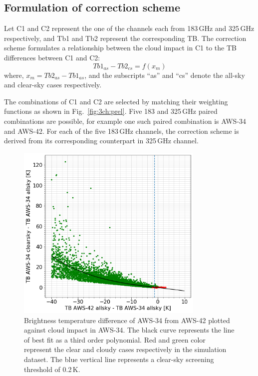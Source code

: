 \documentclass[12pt]{article}
\begin{document}
\subsection{Formulation of correction scheme}
%
Let C1 and C2 represent the one of the channels each from 183\,GHz and 325\,GHz
respectively, and Tb1 and Tb2 represent the corresponding TB. The correction
scheme formulates a relationship between the cloud impact in C1 to the TB
differences between C1 and C2:
\begin{equation}
Tb1_{as}-Tb2_{cs} = f(x_m)
\label{eq:TB:diff}
\end{equation}
where, $x_m = Tb2_{as} - Tb1_{as}$, and the subscripts ``as'' and ``cs'' denote the all-sky and clear-sky cases respectively.  

The combinations of C1 and C2 are selected by matching their weighting
functions as shown in Fig.~\ref{fig:3ch:prel}. Five 183 and 325\,GHz paired
combinations are possible, for example one such paired combination is AWS-34
and AWS-42. For each of the five 183\,GHz channels, the correction scheme is
derived from its corresponding counterpart in 325\,GHz channel.

\begin{figure}[!tb]
	\centering
	\includegraphics[height=85mm]{fit_AWS-34_AWS-42}\hspace{5mm}%
	\caption{Brightness temperature difference of AWS-34 from AWS-42 plotted
      against cloud impact in AWS-34. The black curve represents the line of
      best fit as a third order polynomial. Red and green color represent the
      clear and cloudy cases respectively in the simulation dataset. The blue
      vertical line represents a clear-sky screening threshold of 0.2\,K. }
	\label{fig:fit:c34-42}
\end{figure}
%
\end{document}
